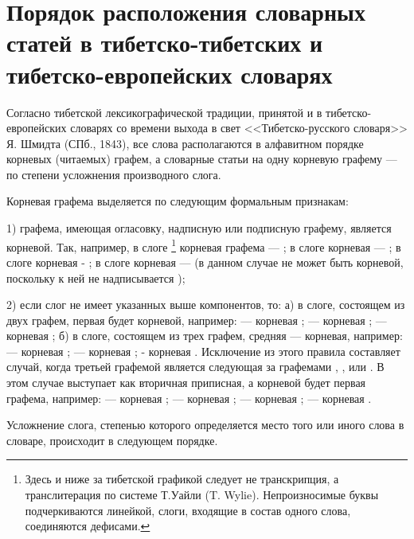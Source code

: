 \section{Порядок расположения словарных статей в тибетско-тибетских и тибетско-европейских словарях}

Согласно тибетской лексикографической традиции, принятой и в тибетско-европейских словарях со времени выхода в свет <<Тибетско-русского словаря>> Я. Шмидта (СПб., 1843), все слова располагаются в алфавитном порядке корневых (читаемых) графем, а словарные статьи на одну корневую графему --- по степени усложнения производного слога.

Корневая графема выделяется по следующим формальным признакам:

1) графема, имеющая огласовку, надписную или подписную графему, является корневой. Так, например, в слоге \footnote[17]{Здесь и ниже за тибетской графикой следует не транскрипция, а транслитерация по системе Т.Уайли (T. Wylie). Непроизносимые буквы подчеркиваются линейкой, слоги, входящие в состав одного слова, соединяются дефисами.} корневая графема --- ; в слоге  корневая --- ; в слоге	 корневая - ; в слоге  корневая ---  (в данном случае  не может быть корневой, поскольку к ней не надписывается );

2)	если слог не имеет указанных выше компонентов, то: а) в слоге, состоящем из двух графем, первая будет корневой, например:
 --- корневая ;
 --- корневая ;
 ---	корневая ;
б) в слоге, состоящем из трех графем, средняя --- корневая, например:
 --- корневая ;
 --- корневая ;
 - корневая .
Исключение из этого правила составляет случай, когда третьей графемой является  следующая за графемами , ,  или . В этом случае  выступает как вторичная приписная, а корневой будет первая графема, например:
 --- корневая ;
 --- корневая ;
 --- корневая ;
 --- корневая .

Усложнение слога, степенью которого определяется место того или иного слова в словаре, происходит в следующем порядке.

